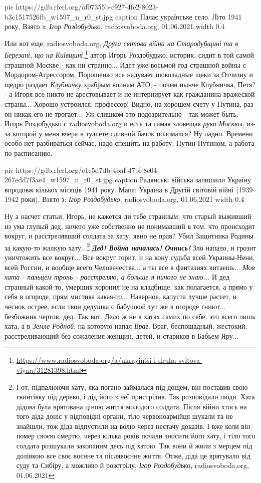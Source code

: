 \ifcmt
  pic https://gdb.rferl.org/af07355b-c927-4fe2-8023-b3c1517526fb_w1597_n_r0_st.jpg
  caption Палає українське село. Літо 1941 року, Взято з: \emph{Ігор Роздобудько}, radiosvoboda.org, 01.06.2021
  width 0.4
\fi

Или вот еще, radiosvoboda.org, \emph{Друга світова війна на Стародубщині та в
Березані, що на
Київщині},\footnote{\url{https://www.radiosvoboda.org/a/ukrayintsi-i-druha-svitova-viyna/31281398.html}}
автор Игорь Роздобудько, историк, сидит в той самой страшной Москве - как ни
странно...  Идет уже восьмой год страшной войны с Мордором-Агрессором,
Порошенко все надувает шоколадные щеки за Отчизну и щедро раздает
\emph{Клубничку} храбрым воинам АТО, - почем нынче Клубничка, Петя? - а Игоря
все никто не арестовывает и не интернирует как гражданина вражеской страны...
Хорошо устроился, профессор! Видно, на хорошем счету у Путина, раз он никак его
не трогает... Уж слишком это подозрительно - так может быть, Игорь Роздобудько
с radiosvoboda.org и есть та самая зловещая \emph{рука Москвы}, из-за которой у
меня вчера в туалете сливной бачок поломался? Ну ладно. Времени особо нет
разбираться сейчас, надо спешить на работу. Путин-Путином, а работа по
расписанию.

\ifcmt
  pic https://gdb.rferl.org/e1c5d7db-4baf-47bf-8e04-267edd7f3ae4_w1597_n_r0_st.jpg
  caption Радянські війська залишили Україну впродовж кількох місяців 1941 року. Мапа: Україна в Другій світовій війні (1939–1942 роки), Взято з: \emph{Ігор Роздобудько}, radiosvoboda.org, 01.06.2021
  width 0.4
\fi

Ну а насчет статьи, Игорь, не кажется ли тебе странным, что старый выживший из
ума глупый дед, ничего уже собственно не понимавший в том, что происходит
вокруг, и расстрелявший солдата за хату, явно не прав? Убил Защитника Родины за
какую-то жалкую хату...\footnote{
І от, підпалюючи хату, яка погано займалася під дощем, він поставив свою
гвинтівку під дерево, і дід його з неї пристрілив. Так розповідали люди. Хата
дідова була врятована ціною життя молодого солдата. Після війни хтось на того
діда доніс у відповідні органи, тіло червоноармійця шукали та не знайшли, тож
діда відпустили на волю через нестачу доказів. І вже коли він помер своєю
смертю, через кілька років почали зносити його хату, і тіло того солдата
розшукали закопаним десь під хатою. Так вони й жили з мерцем під долівкою все
своє воєнне та післявоєнне життя. Отже, діда це врятувало від суду та Сибіру, а
можливо й розстрілу, \emph{Ігор Роздобудько}, radiosvoboda.org, 01.06.2021} \textbf{\emph{Дед! Война
началась! Очнись!}} Зло напало, и грозит уничтожить все вокруг... Все вокруг
горит, и на кону судьба всей Украины-Нени, всей России, и вообще всего
Человечества...  а ты все в фантазиях витаешь... \emph{Моя хата - пальцем тронь
- расстреляю, а больше я ничого не знаю...} И дед странный какой-то, умерших
хоронил не на кладбище, как полагается, а прямо у себя в огороде, прям мистика
какая-то... Наверное, капуста лучше растет, и чеснок острее, если твои дедушка
с бабушкой тут же в огороде гниют...  безбожник чертов, дед. Так вот. Дело ж не
в хатах самих по себе, это всего лишь хата, а в \emph{Земле Родной}, на которую
напал \emph{Враг}. Враг, беспощадный, жестокий; расстреливающий без сожаления
женщин, детей, и стариков в Бабьем Яру...



